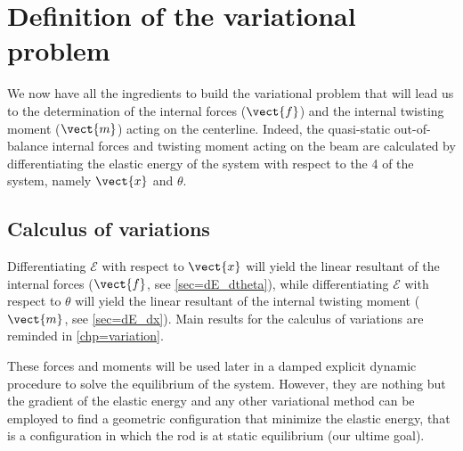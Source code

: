 \section{Definition of the variational problem}\label{sec=varpb}
We now have all the ingredients to build the variational problem that will lead us to the determination of the internal forces ($\vect{f}$) and the internal twisting moment ($\vect{m}$) acting on the centerline. Indeed, the quasi-static out-of-balance internal forces and twisting moment acting on the beam are calculated by differentiating the elastic energy of the system with respect to the 4 \dofs{} of the system, namely $\vect{x}$ and $\theta$.



\subsection{Calculus of variations}
Differentiating $\mathcal{E}$ with respect to $\vect{x}$ will yield the linear resultant of the internal forces ($\vect{f}$, see \cref{sec=dE_dtheta}), while differentiating $\mathcal{E}$ with respect to $\theta$ will yield the linear resultant of the internal twisting moment ($\vect{m}$, see \cref{sec=dE_dx}). Main results for the calculus of variations are reminded in \cref{chp=variation}.

These forces and moments will be used later in a damped explicit dynamic procedure to solve the equilibrium of the system. However, they are nothing but the gradient of the elastic energy and any other variational method can be employed to find a geometric configuration that minimize the elastic energy, that is a configuration in which the rod is at static equilibrium (our ultime goal).


